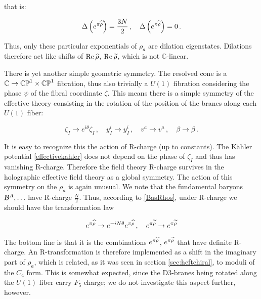 that is:

\begin{equation}
	\Delta\left( e^{\pi\widehat{\rho}} \right) = \frac{3N}{2}\,,\quad \Delta\left( e^{\pi\widetilde{\rho}} \right) = 0\,.
\end{equation}

Thus, only these particular exponentials of $\rho_a$ are dilation eigenstates. Dilations therefore act like shifts of $\operatorname{Re} \widehat{\rho}$, $\operatorname{Re} \widetilde{\rho}$, which is not $\mathbb{C}$-linear.

There is yet another simple geometric symmetry. The resolved cone is a $\mathbb{C} \rightarrow \mathbb{CP}^1 \times \mathbb{CP}^1$ fibration, thus also trivially a $U(1)$ fibration considering the phase $\psi$ of the fibral coordinate $\zeta$. This means there is a simple symmetry of the effective theory consisting in the rotation of the position of the branes along each $U(1)$ fiber:

\begin{equation}
	\zeta_I \rightarrow e^{i\theta} \zeta_I\,, \quad y^i_I \rightarrow y^i_I\,, \quad v^a \rightarrow v^a\,,\quad \beta \rightarrow \beta\,.
	\label{}
\end{equation}

It is easy to recognize this the action of R-charge (up to constants). The K\"ahler potential \eqref{effectivekahler} does not depend on the phase of $\zeta_I$ and thus has vanishing R-charge. Therefore the field theory R-charge survives in the holographic effective field theory as a global symmetry. The action of this symmetry on the $\rho_a$ is again unusual. We note that the fundamental baryons $\mathcal{B}^A, \ldots$ have R-charge $\frac{N}{2}$. Thus, according to \eqref{BasRhos}, under R-charge we should have the transformation law

\begin{equation}
	e^{\pi \widehat{\rho}} \rightarrow e^{-iN\theta} e^{\pi\widehat{\rho}}\,,\quad e^{\pi\widetilde{\rho}} \rightarrow e^{\pi\widetilde{\rho}}
	\label{}
\end{equation}

The bottom line is that it is the combinations $e^{\pi \widehat{\rho}}$, $e^{\pi\widetilde{\rho}}$ that have definite R-charge. An R-transformation is therefore implemented as a shift in the imaginary part of $\rho_a$, which is related, as it was seen in section \ref{sec:heftchiral}, to moduli of the $C_4$ form. This is somewhat expected, since the D3-branes being rotated along the $U(1)$ fiber carry $F_5$ charge; we do not investigate this aspect further, however.

